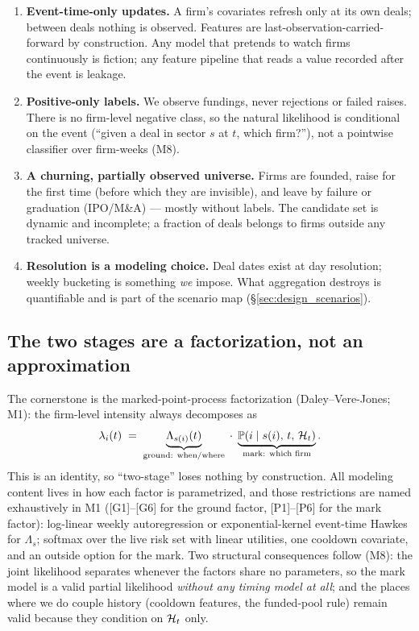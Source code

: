 \begin{enumerate}[leftmargin=1.6em]
\item \textbf{Event-time-only updates.} A firm's covariates refresh only at its
own deals; between deals nothing is observed. Features are
last-observation-carried-forward by construction. Any model that pretends to
watch firms continuously is fiction; any feature pipeline that reads a value
recorded after the event is leakage.
\item \textbf{Positive-only labels.} We observe fundings, never rejections or
failed raises. There is no firm-level negative class, so the natural likelihood
is conditional on the event (``given a deal in sector $s$ at $t$, which
firm?''), not a pointwise classifier over firm-weeks (M8).
\item \textbf{A churning, partially observed universe.} Firms are founded,
raise for the first time (before which they are invisible), and leave by
failure or graduation (IPO/M\&A) --- mostly without labels. The candidate set
is dynamic and incomplete; a fraction of deals belongs to firms outside any
tracked universe.
\item \textbf{Resolution is a modeling choice.} Deal dates exist at day
resolution; weekly bucketing is something \emph{we} impose. What aggregation
destroys is quantifiable and is part of the scenario map
(\S\ref{sec:design_scenarios}).
\end{enumerate}

\subsection{The two stages are a factorization, not an approximation}
\label{sec:design_factorization}

The cornerstone is the marked-point-process factorization (Daley--Vere-Jones;
M1): the firm-level intensity always decomposes as
\begin{equation}
\lambda_i(t)\;=\;\underbrace{\Lambda_{s(i)}(t)}_{\text{ground: when/where}}
\;\cdot\;
\underbrace{\mathbb{P}\!\left(i \mid s(i),\,t,\,\mathcal{H}_t\right)}_{\text{mark: which firm}}.
\label{eq:design_factorization}
\end{equation}
This is an identity, so ``two-stage'' loses nothing by construction. All
modeling content lives in how each factor is parametrized, and those
restrictions are named exhaustively in M1 ([G1]--[G6] for the ground factor,
[P1]--[P6] for the mark factor): log-linear weekly autoregression or
exponential-kernel event-time Hawkes for $\Lambda_s$; softmax over the live
risk set with linear utilities, one cooldown covariate, and an outside option
for the mark. Two structural consequences follow (M8): the joint likelihood
separates whenever the factors share no parameters, so the mark model is a
valid partial likelihood \emph{without any timing model at all}; and the places
where we do couple history (cooldown features, the funded-pool rule) remain
valid because they condition on $\mathcal{H}_t$ only.

